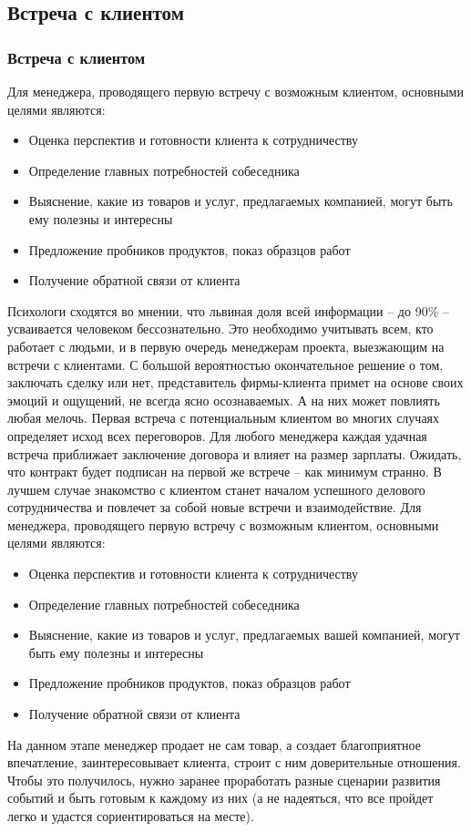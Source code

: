 \documentclass{../industrial-development}
\begin{document}
\subsection{Встреча с клиентом}
\begin{frame} \frametitle{Встреча с клиентом}
Для менеджера, проводящего первую встречу с возможным клиентом, основными целями являются:
\begin{itemize}	
		\item Оценка перспектив и готовности клиента к сотрудничеству
		\item Определение главных потребностей собеседника
	 	\item Выяснение, какие из товаров и услуг, предлагаемых компанией, могут быть ему полезны и интересны
	 	\item Предложение пробников продуктов, показ образцов работ
		\item Получение обратной связи от клиента

 \end{itemize}
\end{frame}
\lecturenotes
Психологи сходятся во мнении, что львиная доля всей информации – до 90\% – усваивается человеком бессознательно. Это необходимо учитывать всем, кто работает с людьми, и в первую очередь менеджерам проекта, выезжающим на встречи с клиентами. С большой вероятностью окончательное решение о том, заключать сделку или нет, представитель фирмы-клиента примет на основе своих эмоций и ощущений, не всегда ясно осознаваемых. А на них может повлиять любая мелочь. 
Первая встреча с потенциальным клиентом во многих случаях определяет исход всех переговоров. Для любого менеджера каждая удачная встреча приближает заключение договора и влияет на размер зарплаты. 
Ожидать, что контракт будет подписан на первой же встрече – как минимум странно. В лучшем случае знакомство с клиентом станет началом успешного делового сотрудничества и повлечет за собой новые встречи и взаимодействие. 
Для менеджера, проводящего первую встречу с возможным клиентом, основными целями являются: 
\begin{itemize} 
\item Оценка перспектив и готовности клиента к сотрудничеству 
\item Определение главных потребностей собеседника 
\item Выяснение, какие из товаров и услуг, предлагаемых вашей компанией, могут быть ему полезны и интересны 
\item Предложение пробников продуктов, показ образцов работ 
\item Получение обратной связи от клиента 
\end{itemize} 
На данном этапе менеджер продает не сам товар, а создает благоприятное впечатление, заинтересовывает клиента, строит с ним доверительные отношения. Чтобы это получилось, нужно заранее проработать разные сценарии развития событий и быть готовым к каждому из них (а не надеяться, что все пройдет легко и удастся сориентироваться на месте).
\end{document}

